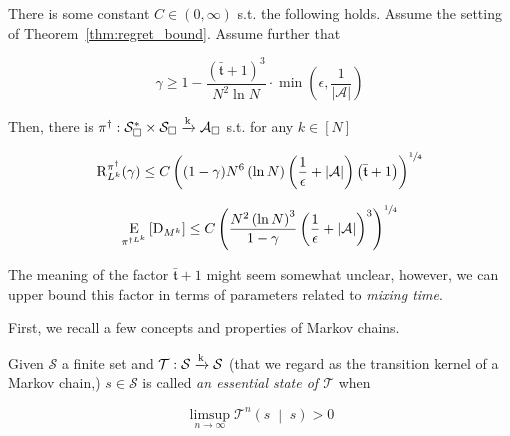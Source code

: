 \documentclass[anon,12pt]{colt2018} %
\newcommand{\AP}[1]{\left(#1\right)}
\newcommand{\AB}[1]{\left[#1\right]}
\newcommand{\APM}[2]{\left(#1\;\middle\vert\;#2\right)}
\newcommand{\Ea}[2]{\underset{#1}{\operatorname{E}}\AB{#2}}
\newcommand{\Abs}[1]{\left\vert #1 \right\vert}
\newcommand{\K}{\xrightarrow{\textnormal{k}}}
\newcommand{\A}{\mathcal{A}}
\newcommand{\St}{\mathcal{S}}
\newcommand{\T}{\mathcal{T}}
\newcommand{\Rg}{\operatorname{R}}
\newcommand{\Tn}{\mathfrak{t}}
\newcommand{\ND}{\operatorname{D}}
\begin{document}
\begin{samepage}
\begin{corollary}
\label{crl:balanced_regret_bound}

There is some constant $C \in (0,\infty)$ s.t. the following holds. Assume the setting of Theorem~\ref{thm:regret_bound}. Assume further that 

\begin{equation}
\gamma \geq 1 - \frac{\AP{\bar{\Tn}+1}^3}{N^2 \ln{N}}\cdot\min\AP{\epsilon,\frac{1}{\Abs{\A}}}
\end{equation}

Then, there is $\pi^\dagger: \St_\square^* \times \St_\square \K \A_\square$ s.t. for any $k\in[N]$

\begin{equation}
\label{eqn:crl__balanced_regret_bound__regret}
\Rg_{L^k}^{\pi^\dagger}(\gamma) \leq C\AP{(1-\gamma)N^6 \AP{\ln N} \AP{\frac{1}{\epsilon}+\Abs{\A}}\AP{\bar{\Tn}+1}}^{\sfrac{1}{4}}
\end{equation}

\begin{equation}
\label{eqn:crl__balanced_regret_bound__delegations}
\Ea{\pi^{\dagger L^k}}{\ND_{M^k}} \leq C\AP{\frac{N^2\AP{\ln{N}}^3}{1-\gamma}\AP{\frac{1}{\epsilon}+\Abs{\A}}^3}^{\sfrac{1}{4}}
\end{equation}

\end{corollary}
\end{samepage}

The meaning of the factor $\bar{\Tn}+1$ might seem somewhat unclear, however, we can upper bound this factor in terms of parameters related to \emph{mixing time}. 

First, we recall a few concepts and properties of Markov chains.

\begin{samepage}
\begin{definition}

Given $\St$ a finite set and $\T: \St \K \St$ (that we regard as the transition kernel of a Markov chain,) $s \in \St$ is called \emph{an essential state of $\T$} when

\begin{equation}
\limsup_{n \rightarrow \infty} {\T^n\APM{s}{s}} > 0
\end{equation}

\end{definition}
\end{samepage}
\end{document}
